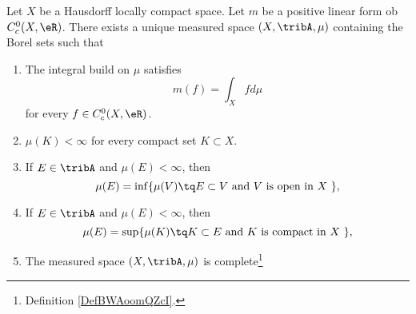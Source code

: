 \begin{theorem}      \label{THOooTWZWooHqGDAx}
    Let \( X\) be a Hausdorff locally compact space. Let \( m\) be a positive linear form ob \( C^0_c(X, \eR)\). There exists a unique measured space \( (X,\tribA, \mu)\)  containing the Borel sets such that
    \begin{enumerate}
        \item       \label{ITEMooAKLQooWLetDk}
            The integral build on \( \mu\) satisfies
            \begin{equation}
                m(f)=\int_X fd\mu
            \end{equation}
            for every \( f\in C^0_c(X,\eR)\).
        \item       \label{ITEMooFLYHooTNUENu}
            \( \mu(K)<\infty\) for every compact set \( K\subset X\).
        \item       \label{ITEMooKDTLooJuUTaW}
            If \( E\in\tribA\) and \( \mu(E)<\infty\), then
            \begin{equation}
                \mu(E)=\inf\{ \mu(V)\tq E\subset V \text{ and \( V\) is open in \( X\) }\},
            \end{equation}
        \item
            If \( E\in\tribA\) and \( \mu(E)<\infty\), then
            \begin{equation}
                \mu(E)=\sup\{ \mu(K)\tq K\subset E \text{ and \( K\) is compact in \( X\) }\},
            \end{equation}
        \item
            The measured space \( (X,\tribA,\mu)\) is complete\footnote{Definition \ref{DefBWAoomQZcI}.}
    \end{enumerate}
\end{theorem}

